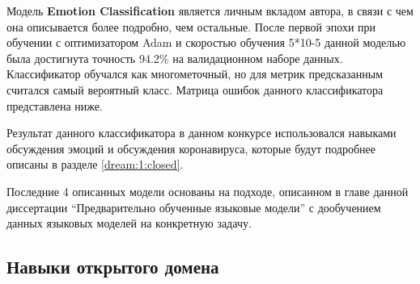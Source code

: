 Модель \textbf{Emotion Classification} является личным вкладом автора, в связи с чем она описывается более подробно, чем остальные. После первой эпохи при обучении с оптимизатором Adam и скоростью обучения 5*10-5 данной моделью была достигнута точность 94.2\% на валидационном наборе данных. Классификатор обучался как многометочный, но для метрик предсказанным считался самый вероятный класс. Матрица ошибок данного классификатора представлена ниже.


\begin{table}[htbp]
\centering
\caption {Матрица ошибок классификатора эмоций из Alexa Prize Challenge 3}
\label{tab:dream1}%
\end{table}



Результат данного классификатора в данном конкурсе использовался навыками обсуждения эмоций и обсуждения коронавируса, которые будут подробнее описаны в разделе \ref{dream:1:closed}.

Последние 4 описанных модели основаны на подходе, описанном в главе данной диссертации “Предварительно обученные языковые модели” с дообучением данных языковых моделей на конкретную задачу. 

\subsection{Навыки открытого домена}

